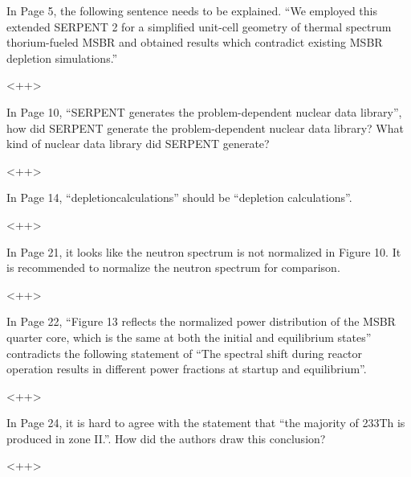 \documentclass[answers,11pt]{exam}
\begin{document}
\begin{questions}
        \question  In Page 5, the following sentence needs to be explained. ``We 
        employed this extended SERPENT 2 for a simplified unit-cell geometry of 
        thermal spectrum thorium-fueled MSBR and obtained results which 
        contradict existing MSBR depletion simulations.''
        \begin{solution}
                <++>
        \end{solution}

        \question  In Page 10, ``SERPENT generates the problem-dependent nuclear 
        data library'', how did SERPENT generate the problem-dependent nuclear 
        data library? What kind of nuclear data library did SERPENT generate?
        \begin{solution}
                <++>
        \end{solution}

        \question  In Page 14, ``depletioncalculations'' should be ``depletion 
        calculations''.
        \begin{solution}
                <++>
        \end{solution}

        \question  In Page 21, it looks like the neutron spectrum is not 
        normalized in Figure 10. It is recommended to normalize the neutron 
        spectrum for comparison.
        \begin{solution}
                <++>
        \end{solution}

        \question  In Page 22, ``Figure 13 reflects the normalized power 
        distribution of the MSBR quarter core, which is the same at both the 
        initial and equilibrium states'' contradicts the following statement of 
        ``The spectral shift during reactor operation results in different power 
        fractions at startup and equilibrium''.
        \begin{solution}
                <++>
        \end{solution}

        \question  In Page 24, it is hard to agree with the statement that ``the 
        majority of 233Th is produced in zone II.''. How did the authors draw 
        this conclusion?
        \begin{solution}
                <++>
        \end{solution}


\end{questions}
\end{document}
